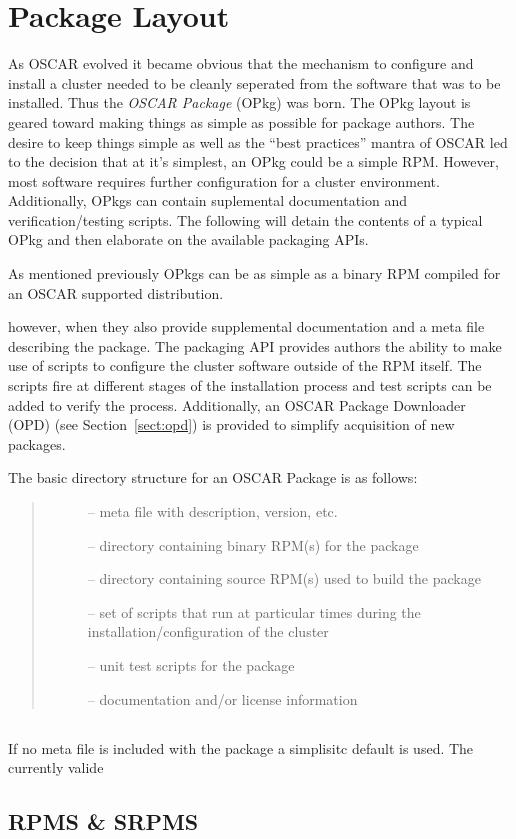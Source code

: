 
\section{Package Layout}
\label{sect:pkg-layout}

As OSCAR evolved it became obvious that the mechanism to configure and
install a cluster needed to be cleanly seperated from the software that was
to be installed.  Thus the \emph{OSCAR Package} (OPkg) was born.  The OPkg
layout is geared toward making things as simple as possible for package
authors.  The desire to keep things simple as well as the ``best
practices'' mantra of OSCAR led to the decision that at it's simplest, an
OPkg could be a simple RPM.  However, most software requires further
configuration for a cluster environment.  Additionally, OPkgs can contain
suplemental documentation and verification/testing scripts.  The following
will detain the contents of a typical OPkg and then elaborate on the
available packaging APIs.

As mentioned previously OPkgs can be as simple as a binary RPM compiled for
an OSCAR supported distribution.  


however, when they also provide supplemental documentation and a meta file
describing the package.  The packaging API provides authors the ability to
make use of scripts to configure the cluster software outside of the RPM
itself.  The scripts fire at different stages of the installation process
and test scripts can be added to verify the process. Additionally, an OSCAR
Package Downloader (OPD) (see Section~\ref{sect:opd}) is provided to
simplify acquisition of new packages.

The basic directory structure for an OSCAR Package is as follows:
\begin{quote}
\begin{description}
    \item[] -- meta file with description, version, etc.
    \item[] -- directory containing binary RPM(s) for the package
    \item[] -- directory containing source RPM(s) used to build
                            the package
    \item[] --  set of scripts that run at particular times
                     during the installation/configuration of the cluster
    \item[] -- unit test scripts for the package
    \item[] -- documentation and/or license information
\end{description}
\end{quote}


\subsection{}
If no meta file is included with the package a simplisitc default is used.
The currently valide 

\subsection{RPMS \& SRPMS}

